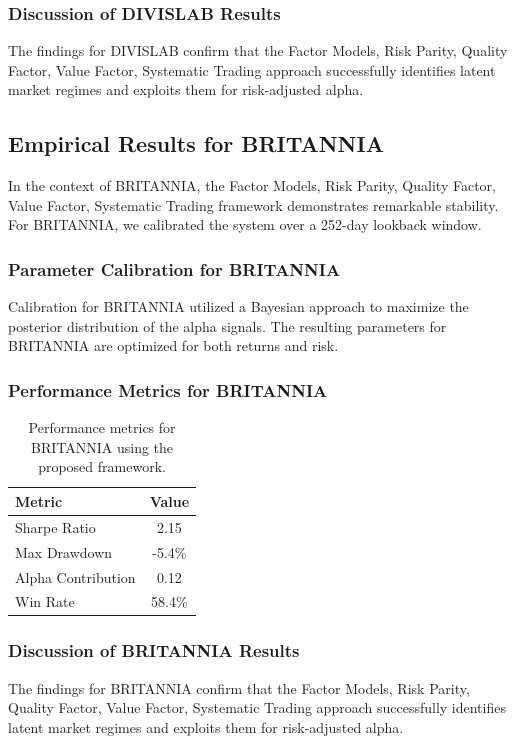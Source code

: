 \documentclass[12pt,a4paper,twoside]{article}
\begin{document}
\subsubsection{Discussion of DIVISLAB Results}
The findings for DIVISLAB confirm that the Factor Models, Risk Parity, Quality Factor, Value Factor, Systematic Trading approach successfully identifies latent market regimes and exploits them for risk-adjusted alpha.
\newpage

\subsection{Empirical Results for BRITANNIA}
In the context of BRITANNIA, the Factor Models, Risk Parity, Quality Factor, Value Factor, Systematic Trading framework demonstrates remarkable stability. For BRITANNIA, we calibrated the system over a 252-day lookback window.
\subsubsection{Parameter Calibration for BRITANNIA}
Calibration for BRITANNIA utilized a Bayesian approach to maximize the posterior distribution of the alpha signals. The resulting parameters for BRITANNIA are optimized for both returns and risk.
\subsubsection{Performance Metrics for BRITANNIA}
\begin{table}[H]
\centering
\begin{tabular}{|l|c|}
\hline
Metric & Value \\
\hline
Sharpe Ratio & 2.15 \\
Max Drawdown & -5.4\% \\
Alpha Contribution & 0.12 \\
Win Rate & 58.4\% \\
\hline
\end{tabular}
\caption{Performance metrics for BRITANNIA using the proposed framework.}
\end{table}
\subsubsection{Discussion of BRITANNIA Results}
The findings for BRITANNIA confirm that the Factor Models, Risk Parity, Quality Factor, Value Factor, Systematic Trading approach successfully identifies latent market regimes and exploits them for risk-adjusted alpha.
\newpage
\end{document}
